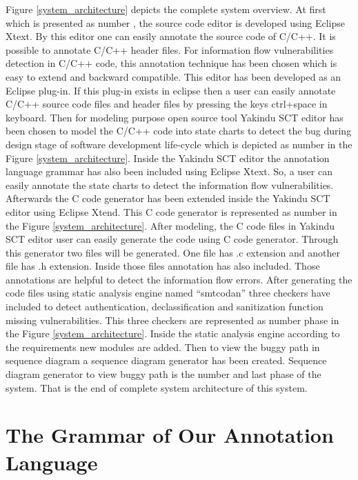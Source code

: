 Figure \ref{system_architecture} depicts the complete system overview. At first which is presented as number , the source code editor is developed using Eclipse Xtext. By this editor one can easily annotate the source code of C/C++. It is possible to annotate C/C++ header files. For information flow vulnerabilities detection in C/C++ code, this annotation technique has been chosen which is easy to extend and backward compatible. This editor has been developed as an Eclipse plug-in. If this plug-in exists in eclipse then a user can easily annotate C/C++ source code files and header files by pressing the keys ctrl+space in keyboard. Then for modeling purpose open source tool Yakindu SCT editor \cite{ref_15_yakindu:sct} has been chosen to model the C/C++ code into state charts to detect the bug during design stage of software development life-cycle which is depicted as number  in the Figure \ref{system_architecture}. Inside the Yakindu SCT editor the annotation language grammar has also been included using Eclipse Xtext. So, a user can easily annotate the state charts to detect the information flow vulnerabilities. Afterwards the C code generator has been extended inside the Yakindu SCT editor using Eclipse Xtend. This C code generator is represented as number  in the Figure \ref{system_architecture}. After modeling, the C code files in Yakindu SCT editor user can easily generate the code using C code generator. Through this generator two files will be generated. One file has .c extension and another file has .h extension. Inside those files annotation has also included. Those annotations are helpful to detect the information flow errors. After generating the code files using static analysis engine named \enquote{smtcodan} three checkers have included to detect authentication, declassification and sanitization function missing vulnerabilities. This three checkers are represented as number  phase in the Figure \ref{system_architecture}. Inside the static analysis engine according to the requirements new modules are added. Then to view the buggy path in sequence diagram a sequence diagram generator has been created. Sequence diagram generator to view buggy path is the number  and last phase of the system. That is the end of complete system architecture of this system. 


\section{The Grammar of Our Annotation Language}

